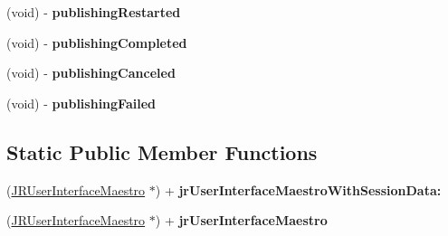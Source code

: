 \begin{DoxyCompactItemize}
\item 
\hypertarget{interface_j_r_user_interface_maestro_a14f7f64312895526cd379156bcf1a82a}{
(void) -\/ {\bfseries publishingRestarted}}
\label{interface_j_r_user_interface_maestro_a14f7f64312895526cd379156bcf1a82a}

\item 
\hypertarget{interface_j_r_user_interface_maestro_ac4bc45376e873be008666f37ee82ba22}{
(void) -\/ {\bfseries publishingCompleted}}
\label{interface_j_r_user_interface_maestro_ac4bc45376e873be008666f37ee82ba22}

\item 
\hypertarget{interface_j_r_user_interface_maestro_acb905f024aa28420ab48b9874df1d318}{
(void) -\/ {\bfseries publishingCanceled}}
\label{interface_j_r_user_interface_maestro_acb905f024aa28420ab48b9874df1d318}

\item 
\hypertarget{interface_j_r_user_interface_maestro_a5db37ce1ea426e62c98eb553f1740aad}{
(void) -\/ {\bfseries publishingFailed}}
\label{interface_j_r_user_interface_maestro_a5db37ce1ea426e62c98eb553f1740aad}

\end{DoxyCompactItemize}
\subsection*{Static Public Member Functions}
\begin{DoxyCompactItemize}
\item 
\hypertarget{interface_j_r_user_interface_maestro_aad2be7661d3f1cb008615b1f0f80cf89}{
(\hyperlink{interface_j_r_user_interface_maestro}{JRUserInterfaceMaestro} $\ast$) + {\bfseries jrUserInterfaceMaestroWithSessionData:}}
\label{interface_j_r_user_interface_maestro_aad2be7661d3f1cb008615b1f0f80cf89}

\item 
\hypertarget{interface_j_r_user_interface_maestro_aa88a961689bf32890934d9baa4ce1455}{
(\hyperlink{interface_j_r_user_interface_maestro}{JRUserInterfaceMaestro} $\ast$) + {\bfseries jrUserInterfaceMaestro}}
\label{interface_j_r_user_interface_maestro_aa88a961689bf32890934d9baa4ce1455}

\end{DoxyCompactItemize}
